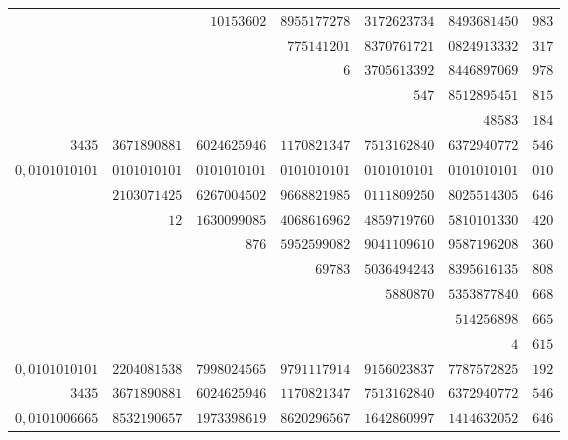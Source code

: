 \begin{longtable}{@{}rrrrrrr@{}}
 &  & $10153602$ & $8955177278$ & $3172623734$ & $8493681450$ & $983$\\
 &  &  & $775141201$ & $8370761721$ & $0824913332$ & $317$\\
 &  &  & $6$ & $3705613392$ & $8446897069$ & $978$\\
 &  &  &  & $547$ & $8512895451$ & $815$\\
 &  &  &  &  & $48583$ & $184$\\
\hline
$3435$ & $3671890881$ & $6024625946$ & $1170821347$ & $7513162840$ & $6372940772$ & $546$\\
\hline
$0{,}0101010101$ & $0101010101$ & $0101010101$ & $0101010101$ & $0101010101$ & $0101010101$ & $010$\\
 & $2103071425$ & $6267004502$ & $9668821985$ & $0111809250$ & $8025514305$ & $646$\\
 & $12$ & $1630099085$ & $4068616962$ & $4859719760$ & $5810101330$ & $420$\\
 &  & $876$ & $5952599082$ & $9041109610$ & $9587196208$ & $360$\\
 &  &  & $69783$ & $5036494243$ & $8395616135$ & $808$\\
 &  &  &  & $5880870$ & $5353877840$ & $668$\\
 &  &  &  &  & $514256898$ & $665$\\
 &  &  &  &  & $4$ & $615$\\
\hline
$0{,}0101010101$ & $2204081538$ & $7998024565$ & $9791117914$ & $9156023837$ & $7787572825$ & $192$\\
$3435$ & $3671890881$ & $6024625946$ & $1170821347$ & $7513162840$ & $6372940772$ & $546$\\
\hline
$0{,}0101006665$ & $8532190657$ & $1973398619$ & $8620296567$ & $1642860997$ & $1414632052$ & $646$\\
\end{longtable}\endgroup

